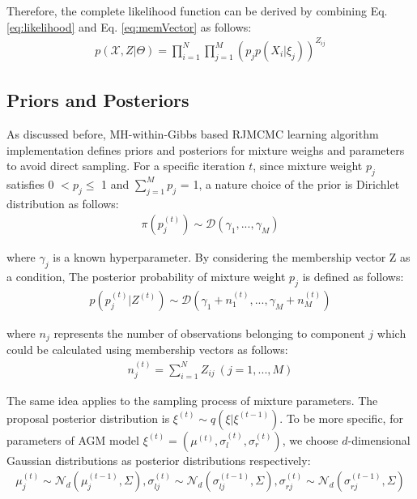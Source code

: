 \documentclass[conference]{IEEEtran}
\begin{document}
Therefore, the complete likelihood function can be derived by combining Eq. \eqref{eq:likelihood} and Eq. \eqref{eq:memVector} as follows:
\begin{align}
p(\mathcal{X}, Z|\Theta) = \prod_{i=1}^{N}\prod_{j=1}^{M}(p_jp(X_i|\xi_j))^{Z_{ij}}
\label{eq:compPdf}
\end{align}

\subsection{Priors and Posteriors}
As discussed before, MH-within-Gibbs based RJMCMC learning algorithm implementation defines priors and posteriors for mixture weighs and parameters to avoid direct sampling. For a specific iteration $t$, since mixture weight $p_j$ satisfies 0 $< p_j \leq$ 1 and $\sum_{j=1}^Mp_j$ = 1, a nature choice of the prior is Dirichlet distribution\cite{b10} as follows:
\begin{align}
\pi(p_j^{(t)}) \sim \mathcal{D}(\gamma_1,...,\gamma_M )
\label{eq:priorWeight}
\end{align}

where $\gamma_j$ is a known hyperparameter. By considering the membership vector Z as a condition, The posterior probability of mixture weight $p_j$ is defined as follows:
\begin{align}
p(p_j^{(t)}|Z^{(t)}) \sim \mathcal{D}(\gamma_1 + n_1^{(t)},...,\gamma_M + n_M^{(t)})
\label{eq:posterWeight}
\end{align}

where $n_j$ represents the number of observations belonging to component $j$ which could be calculated using membership vectors as follows:
\begin{align}
n_j^{(t)} = \sum_{i=1}^NZ_{ij}\ (j = 1,...,M) 
\label{eq:nj}
\end{align}

The same idea applies to the sampling process of mixture parameters. The proposal posterior distribution is  $\xi^{(t)} \sim q(\xi|\xi^{(t-1)})$. To be more specific, for parameters of AGM model $\xi^{(t)} = (\mu^{(t)}, \sigma_{l}^{(t)}, \sigma_{r}^{(t)})$, we choose $d$-dimensional Gaussian distributions as posterior distributions respectively:
\begin{align}
\mu_j^{(t)} \sim \mathcal{N}_d(\mu_j^{(t-1)},\Sigma),
\sigma_{lj}^{(t)} \sim \mathcal{N}_d(\sigma_{lj}^{(t-1)},\Sigma),
\sigma_{rj}^{(t)} \sim \mathcal{N}_d(\sigma_{rj}^{(t-1)},\Sigma)
\label{eq:posters}
\end{align}
\end{document}
